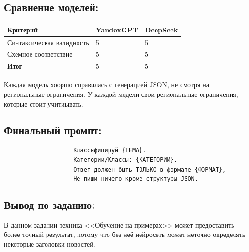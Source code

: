 \subsection{Сравнение моделей:}
\begin{table}[h!]
	\centering
	\begin{tabular}{|l|p{5cm}|p{5cm}|}
		\hline
		\textbf{Критерий} & \textbf{YandexGPT} & \textbf{DeepSeek} \\
		\hline
		Синтаксическая валидность & 5 & 5 \\
		\hline
		Схемное  соответствие & 5 & 5 \\
		\hline
		\textbf{Итог} & 5 & 5 \\
		\hline
	\end{tabular}
\end{table}
Каждая модель хооршо справилась с генерацией JSON, не смотря на региональные ограничения. У каждой модели свои региональные ограничения, которые стоит учитиывать.
\subsection{Финальный промпт:}
\begin{verbatim}
					Классифицируй {ТЕМА}.
					Категории/Классы: {КАТЕГОРИИ}.
					Ответ должен быть ТОЛЬКО в формате {ФОРМАТ},
					Не пиши ничего кроме структуры JSON.
\end{verbatim}
\subsection{Вывод по заданию:}
\indent В данном задании техника <<Обучение  на  примерах>> может предоставить более точный результат, потому что без неё нейросеть может неточно определять некоторые заголовки новостей.